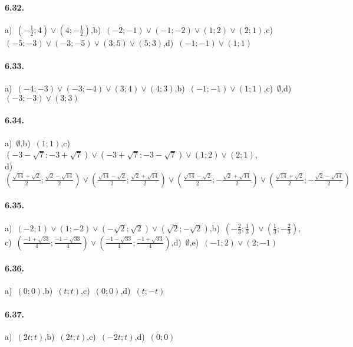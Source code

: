 \paragraph{6.32.} a)~\(\left(-\frac 1 2;4\right)\vee\left(4;-\frac 1 2\right)\),\quad b)~\((-2;-1)\vee(-1;-2)\vee(1;2)\vee(2;1)\),\quad c)~\((-5;-3)\vee(-3;-5)\vee(3;5)\vee(5;3)\),\quad d)~\((-1;-1)\vee(1;1)\)

\paragraph{6.33.} a)~\((-4;-3)\vee(-3;-4)\vee(3;4)\vee(4;3)\),\quad b)~\((-1;-1)\vee(1;1)\),\quad c)~\(\emptyset\),\quad d)~\((-3;-3)\vee(3;3)\)

\paragraph{6.34.} a)~\(\emptyset\),\quad b)~\((1;1)\),\quad c)~\((-3-\sqrt 7;-3+\sqrt 7)\vee(-3+\sqrt 7;-3-\sqrt 7)\vee(1;2)\vee(2;1)\),\protect\\
\quad d)~\(\left(\frac{\sqrt{14}+\sqrt 2} 2;\frac{\sqrt 2-\sqrt{14}} 2\right)\vee\left(\frac{\sqrt{14}-\sqrt 2} 2;\frac{\sqrt 2+\sqrt{14}} 2\right)\vee\left(\frac{\sqrt{14}-\sqrt 2} 2;-\frac{\sqrt 2+\sqrt{14}} 2\right)\vee\left(\frac{\sqrt{14}+\sqrt 2} 2;-\frac{\sqrt 2-\sqrt{14}} 2\right)\)

\paragraph{6.35.} a)~\((-2;1)\vee(1;-2)\vee(-\sqrt {2};\sqrt{2})\vee(\sqrt {2};-\sqrt{2})\),\quad b)~\(\left(-\frac 2 3;\frac 1 3\right)\vee\left(\frac 1 3;-\frac 2 3\right)\),\protect\\
\quad c)~\(\left(\frac{-1+\sqrt{33}} 4;\frac{-1-\sqrt{33}} 4\right)\vee \left(\frac{-1-\sqrt{33}} 4;\frac{-1+\sqrt{33}} 4\right)\),\quad d)~\(\emptyset\),\quad e)~\((-1;2)\vee(2;-1)\)

\paragraph{6.36.} a)~\((0;0)\),\quad b)~\((t;t)\),\quad c)~\((0;0)\),\quad d)~\((t;-t)\)

\paragraph{6.37.} a)~\((2t;t)\),\quad b)~\((2t;t)\),\quad c)~\((-2t;t)\),\quad d)~\((0;0)\)

